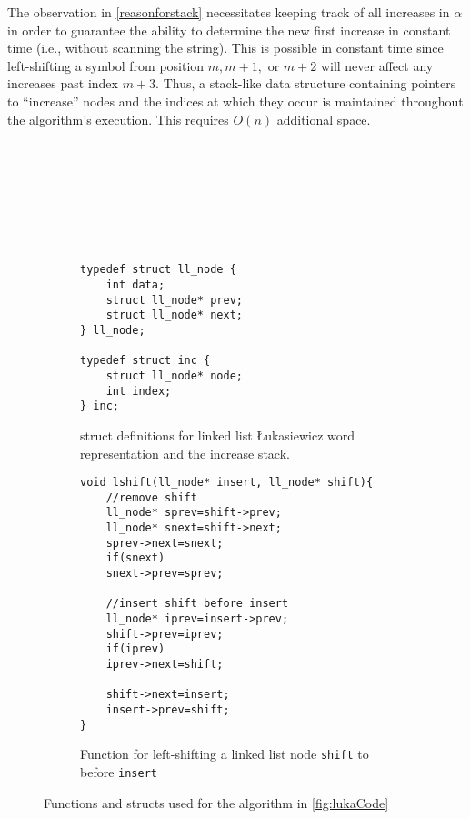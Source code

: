 The observation in \ref{reasonforstack} necessitates keeping track of all increases in $\alpha$ in order to guarantee the ability to determine the new first increase in constant time (i.e., without scanning the string).  This is possible in constant time since left-shifting a symbol from position $m,m+1,$ or $m+2$ will never affect any increases past index $m+3$.  Thus, a stack-like data structure containing pointers to ``increase'' nodes and the indices at which they occur is maintained throughout the algorithm's execution.  This requires $O(n)$ additional space.

    
\begin{figure}[H]
    \begin{subfigure}[]{.5\textwidth}
    \begin{center}
        \begin{Verbatim}








typedef struct ll_node {
    int data;
    struct ll_node* prev;
    struct ll_node* next;
} ll_node;

typedef struct inc {
    struct ll_node* node;
    int index;
} inc;
        \end{Verbatim}
            
    \end{center}

    \caption{struct definitions for linked list Łukasiewicz word representation and the increase stack.}
    \label{fig:lukaStruct}
    \end{subfigure}
    \begin{subfigure}[]{.5\textwidth}
    \begin{center}
        \begin{Verbatim}
void lshift(ll_node* insert, ll_node* shift){
    //remove shift
    ll_node* sprev=shift->prev;
    ll_node* snext=shift->next;
    sprev->next=snext;
    if(snext)
	snext->prev=sprev;

    //insert shift before insert
    ll_node* iprev=insert->prev;
    shift->prev=iprev;
    if(iprev)
	iprev->next=shift;

    shift->next=insert;
    insert->prev=shift;
}
        \end{Verbatim}
    \end{center}

\cprotect\caption{Function for left-shifting a linked list node \verb$shift$ to before \verb$insert$}
    \label{fig:lukaHelpers}
    \end{subfigure}

    \caption{Functions and structs used for the algorithm in \ref{fig:lukaCode}}

\end{figure}

